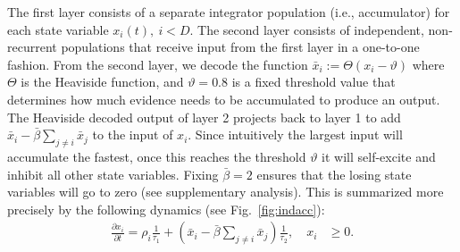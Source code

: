 \documentclass[10pt,letterpaper]{article}
\begin{document}
The first layer consists of a separate integrator population (i.e., accumulator) for each state variable $x_i(t), \ i < D$.
The second layer consists of independent, non-recurrent populations that receive input from the first layer in a one-to-one fashion.
From the second layer, we decode the function $\bar{x}_i := \Theta(x_i - \vartheta)$ where $\Theta$ is the Heaviside function, and $\vartheta = 0.8$ is a fixed threshold value that determines how much evidence needs to be accumulated to produce an output.
The Heaviside decoded output of layer 2 projects back to layer 1 to add $\bar{x}_i - \bar{\beta} \sum_{j \neq i} \bar{x}_j$ to the input of $x_i$.
Since intuitively the largest input will accumulate the fastest, once this reaches the threshold $\vartheta$ it will self-excite and inhibit all other state variables.
Fixing $\bar{\beta} = 2$ ensures that the losing state variables will go to zero (see supplementary analysis).
This is summarized more precisely by the following dynamics (see Fig.~\ref{fig:indacc}):
\begin{equation}
    \begin{split}
        \frac{{\partial x}_i}{\partial t} = \rho_i \frac{1}{\tau_1} + \left( 
            \bar{x}_i - \bar{\beta} \sum_{j \neq i} \bar{x}_j \right) \frac{1}{\tau_2} , \quad x_i &\ge 0 .
    \end{split}
\end{equation}
\end{document}
